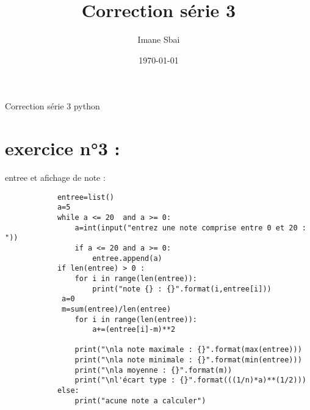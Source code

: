 \documentclass{article}
\title{Correction série 3}
\author{Imane Sbai}
\date {\today}
\begin{document}
\begin{titlepage}
    \begin{center}
Correction s\'{e}rie 3 python
    \end{center}
\end{titlepage}

\section{exercice n°3 :}
        \begin{center}
    		entree et afichage de note :
		\end{center}    	  
        	
    	\begin{verbatim}
			entree=list()
			a=5
			while a <= 20  and a >= 0:
    			a=int(input("entrez une note comprise entre 0 et 20 : "))
    			if a <= 20 and a >= 0:
        			entree.append(a) 
			if len(entree) > 0 :
    			for i in range(len(entree)):
        			print("note {} : {}".format(i,entree[i]))
   			 a=0
   			 m=sum(entree)/len(entree)
    			for i in range(len(entree)):
        			a+=(entree[i]-m)**2
    
    			print("\nla note maximale : {}".format(max(entree)))
    			print("\nla note minimale : {}".format(min(entree)))
    			print("\nla moyenne : {}".format(m))
    			print("\nl'écart type : {}".format(((1/n)*a)**(1/2)))
			else:
    			print("acune note a calculer")
		\end{verbatim}
\end{document}
